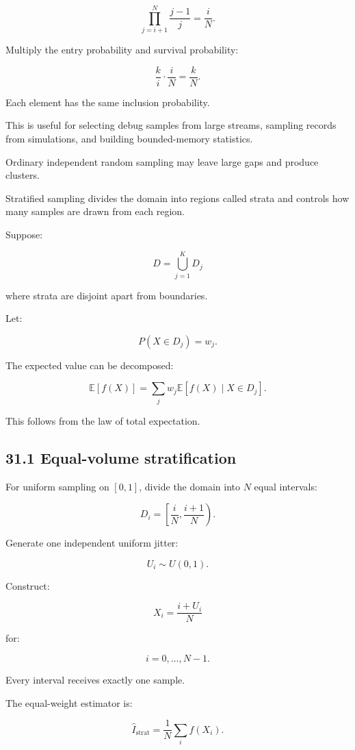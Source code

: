 \[ \prod_{j=i+1}^{N}\frac{j-1}{j} = \frac iN. \]

Multiply the entry probability and survival probability:

\[ \frac ki\cdot\frac iN = \boxed{\frac kN}. \]

Each element has the same inclusion probability.

This is useful for selecting debug samples from large streams, sampling records from simulations, and building bounded-memory statistics.

Ordinary independent random sampling may leave large gaps and produce clusters.

Stratified sampling divides the domain into regions called strata and controls how many samples are drawn from each region.

Suppose:

\[ D=\bigcup_{j=1}^{K}D_j \]

where strata are disjoint apart from boundaries.

Let:

\[ P(X\in D_j)=w_j. \]

The expected value can be decomposed:

\[ \mathbb E[f(X)] = \sum_jw_j\mathbb E[f(X)\mid X\in D_j]. \]

This follows from the law of total expectation.

\subsection{31.1 Equal-volume stratification}\label{02-foundations-ii-ch031-equal-volume-stratification}

\hypertarget{02-foundations-ii-ch031-equal-volume-stratification}{}

For uniform sampling on \([0,1]\), divide the domain into \(N\) equal intervals:

\[ D_i= \left[\frac iN,\frac{i+1}{N}\right). \]

Generate one independent uniform jitter:

\[ U_i\sim U(0,1). \]

Construct:

\[ \boxed{ X_i=\frac{i+U_i}{N} } \]

for:

\[ i=0,\ldots,N-1. \]

Every interval receives exactly one sample.

The equal-weight estimator is:

\[ \boxed{ \widehat I_{\mathrm{strat}} = \frac1N\sum_i f(X_i) }. \]

